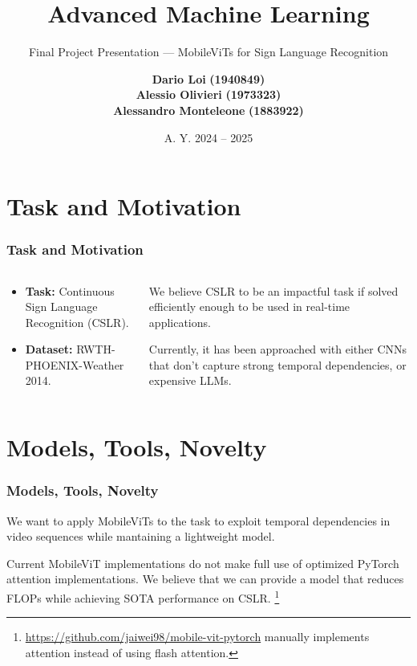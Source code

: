 \documentclass[english, xcolor={table}]{beamer}
\author{\scriptsize \textbf{Dario Loi}  \textbf{(1940849)} \\ \textbf{Alessio Olivieri} \textbf{(1973323)} \\ \textbf{Alessandro Monteleone} \textbf{(1883922)}}
\title{Advanced Machine Learning}
\subtitle{Final Project Presentation --- MobileViTs for Sign Language Recognition}
\institute{M.Sc. in Computer Science, \\ Sapienza, University of Rome.}
\date{A. Y. 2024 -- 2025}
\begin{document}
\maketitle

\section{Task and Motivation}

\begin{frame}
  \frametitle{Task and Motivation}

  \begin{columns}
    \begin{column}{0.4\textwidth}
      \begin{itemize}
        \item \textbf{Task:} Continuous Sign Language Recognition (CSLR).
        \item \textbf{Dataset:} RWTH-PHOENIX-Weather 2014.
      \end{itemize}
    \end{column}
    \begin{column}{0.6\textwidth}
        We believe CSLR to be an impactful task if solved efficiently enough to be used in real-time applications.


        Currently, it has been approached with either CNNs\cite{hu_continuous_2023, ahn_slowfast_2023} that don't capture strong temporal dependencies,
        or expensive LLMs\cite{gong_llms_2024}. 
      \end{column}
  \end{columns}
\end{frame}

\section{Models, Tools, Novelty}
\begin{frame}
  \frametitle{Models, Tools, Novelty}

  We want to apply MobileViTs\cite{mehta_mobilevit_2022} to the task to exploit temporal dependencies in video sequences while mantaining a lightweight model.

  \vspace{1em}

  Current MobileViT implementations do not make full use of optimized PyTorch attention implementations. We believe that we can provide a model that reduces FLOPs while achieving SOTA performance on CSLR.
      \footnote{
        \url{https://github.com/jaiwei98/mobile-vit-pytorch} manually implements attention instead of using flash attention. }

\end{frame}
\end{document}
